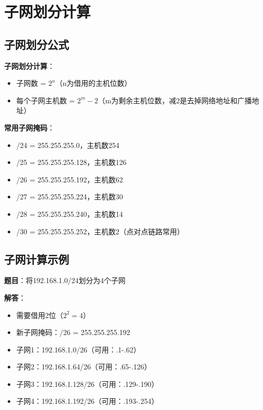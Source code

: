 \documentclass[12pt,a4paper]{ctexart}
\begin{document}
\section{子网划分计算}

\subsection{子网划分公式}

\begin{keybox}
\textbf{子网划分计算}：

\begin{itemize}[itemsep=0pt]
    \item 子网数 = $2^n$（n为借用的主机位数）
    \item 每个子网主机数 = $2^m - 2$（m为剩余主机位数，减2是去掉网络地址和广播地址）
\end{itemize}

\textbf{常用子网掩码}：
\begin{itemize}[itemsep=0pt]
    \item /24 = 255.255.255.0，主机数254
    \item /25 = 255.255.255.128，主机数126
    \item /26 = 255.255.255.192，主机数62
    \item /27 = 255.255.255.224，主机数30
    \item /28 = 255.255.255.240，主机数14
    \item /30 = 255.255.255.252，主机数2（点对点链路常用）
\end{itemize}
\end{keybox}

\subsection{子网计算示例}

\begin{exambox}[子网划分题]
\textbf{题目}：将192.168.1.0/24划分为4个子网

\textbf{解答}：
\begin{itemize}[itemsep=0pt]
    \item 需要借用2位（$2^2=4$）
    \item 新子网掩码：/26 = 255.255.255.192
    \item 子网1：192.168.1.0/26（可用：.1-.62）
    \item 子网2：192.168.1.64/26（可用：.65-.126）
    \item 子网3：192.168.1.128/26（可用：.129-.190）
    \item 子网4：192.168.1.192/26（可用：.193-.254）
\end{itemize}
\end{exambox}
\end{document}
